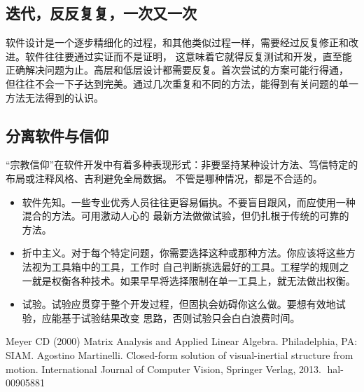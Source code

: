 \documentclass{article}
\begin{document}
\subsection{迭代，反反复复，一次又一次}
软件设计是一个逐步精细化的过程，和其他类似过程一样，需要经过反复修正和改进。软件往往要通过实证而不是证明，
这意味着它就得反复测试和开发，直至能正确解决问题为止。高层和低层设计都需要反复。首次尝试的方案可能行得通，
但往往不会一下子达到完美。通过几次重复和不同的方法，能得到有关问题的单一方法无法得到的认识。

\subsection{分离软件与信仰}
“宗教信仰”在软件开发中有着多种表现形式：非要坚持某种设计方法、笃信特定的布局或注释风格、吉利避免全局数据。
不管是哪种情况，都是不合适的。
\begin{itemize}
    \item 软件先知。一些专业优秀人员往往更容易偏执。不要盲目跟风，而应使用一种混合的方法。可用激动人心的
    最新方法做做试验，但仍扎根于传统的可靠的方法。
    \item 折中主义。对于每个特定问题，你需要选择这种或那种方法。你应该将这些方法视为工具箱中的工具，工作时
    自己判断挑选最好的工具。工程学的规则之一就是权衡各种技术。如果早早将选择限制在单一工具上，就无法做出权衡。
    \item 试验。试验应贯穿于整个开发过程，但固执会妨碍你这么做。要想有效地试验，应能基于试验结果改变
    思路，否则试验只会白白浪费时间。
\end{itemize}

\begin{thebibliography}{99}  
    Meyer CD (2000) Matrix Analysis and Applied Linear Algebra. Philadelphia, PA: SIAM.
     Agostino Martinelli. Closed-form solution of visual-inertial structure from motion. International
    Journal of Computer Vision, Springer Verlag, 2013. ￿hal-00905881
\end{thebibliography}
\end{document}
